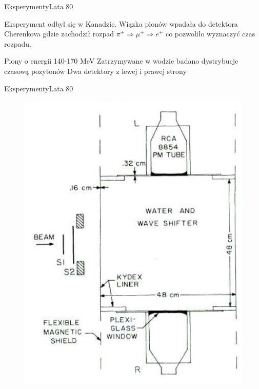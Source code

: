 \documentclass[xcolor={dvipsnames}]{beamer}
\begin{document}
\begin{frame}{Eksperymenty}{Lata 80}
    
    Eksperyment odbyl się w Kanadzie. Wiązka pionów wpadała do detektora Cherenkova gdzie zachodził rozpad $\pi^+ \Rightarrow \mu^+ \Rightarrow e^+$  co pozwoliło wyznaczyć czas rozpadu.
    
    \begin{outline}[enumerate]
        \1 Piony o energii 140-170 MeV
        \1 Zatrzymywane w wodzie badano dystrybucje czasową pozytonów
        \1 Dwa detektory z lewej i prawej strony
    \end{outline}

\end{frame}

\begin{frame}{Eksperymenty}{Lata 80}
    
    \begin{figure}
        \includegraphics[scale=0.7]{giovani2.PNG}
    \end{figure}

\end{frame}
\end{document}
